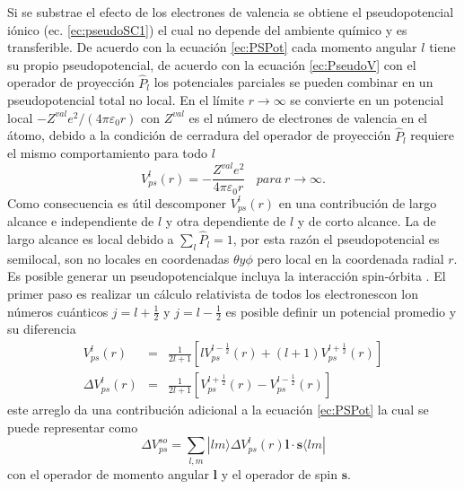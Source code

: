 \documentclass[12pt,a4paper, oneside]{book}
\begin{document}
   Si se substrae el efecto de los electrones de valencia se obtiene el pseudopotencial i\'onico (ec. \ref{ec:pseudoSC1}) el cual no depende del ambiente qu\'imico y es transferible.
   \newline
   De acuerdo con la ecuaci\'on \ref{ec:PSPot} cada momento angular $l$ tiene su propio pseudopotencial, de acuerdo con la ecuaci\'on \ref{ec:PseudoV} con el operador de proyecci\'on $\hat{P}_l$ los potenciales parciales se pueden combinar en un pseudopotencial total no local. En el l\'imite $r \rightarrow \infty$ se convierte en un potencial local $- Z^{val} e^2 / (4 \pi \varepsilon_0 r)$ con $Z^{val}$ es el n\'umero de electrones de valencia en el \'atomo, debido a la condici\'on de cerradura del operador de proyecci\'on $\hat{P}_l$ requiere el mismo comportamiento para todo $l$
   \begin{equation*}
   V_{ps}^l (r)= - \frac{Z^{val} e^2}{4 \pi \varepsilon_0 r} ~~~~para ~ r \rightarrow \infty.
   \end{equation*}
   Como consecuencia es \'util descomponer $V_{ps}^l (r)$ en una contribuci\'on de largo alcance e independiente de $l$ y otra dependiente de $l$ y de corto alcance. La de largo alcance es local debido a $\sum_l \hat{P}_l =1$, por esta raz\'on el pseudopotencial es semilocal, son no locales en coordenadas $\theta y \phi$ pero local en la coordenada radial $r$.
   \newline
   Es posible generar un pseudopotencialque incluya la interacci\'on spin-\'orbita . El primer paso es realizar un c\'alculo relativista de todos los electronescon lon n\'umeros cu\'anticos $j=l+\frac{1}{2}$ y $j=l-\frac{1}{2}$ es posible definir un potencial promedio y su diferencia
   \begin{eqnarray*}
   V_{ps}^l (r) &=& \frac{1}{2 l +1} \left[l V_{ps}^{l-\frac{1}{2}} (r) + (l+1) V_{ps}^{l+\frac{1}{2}} (r)  \right] \\
   \Delta V_{ps}^l (r) &=& \frac{1}{2 l +1} \left[V_{ps}^{l+\frac{1}{2}} (r) -  V_{ps}^{l-\frac{1}{2}} (r)  \right]
   \end{eqnarray*} 
   este arreglo da una contribuci\'on adicional a la ecuaci\'on  \ref{ec:PSPot} la cual se puede representar como
   \begin{equation}
   \Delta V_{ps}^{so} = \sum_{l,m} |lm \rangle \Delta V_{ps}^{l} (r)  \pmb{l} \cdot \pmb{s} \langle lm| \label{ec:psudoSO}
   \end{equation}
   con el operador de momento angular $\pmb{l} $ y el operador de spin $\pmb{s}$.
\end{document}
